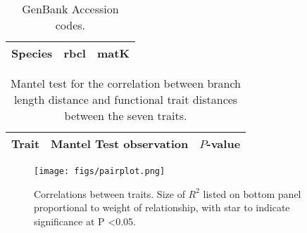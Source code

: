 \documentclass[12pt]{article}\usepackage[]{graphicx}\usepackage[]{color}
\begin{document}
\begin{table}[ht] \centering
	\caption{GenBank Accession codes.}
	\label{Tab:genbank}
	\begin{tabular}{l l l}
	\toprule
		Species & rbcl & matK \\
		\midrule
		
		\bottomrule
	\end{tabular}
\end{table}


\begin{table}[ht]
  \centering
	\caption{Mantel test for the correlation between branch length distance and functional trait distances between the seven traits.}
	\label{Tab:mantel}
	\begin{tabular}{l r r}
	\toprule
		Trait & Mantel Test observation & $P$-value \\
		\midrule
		
		\bottomrule
	\end{tabular}
\end{table}

\begin{figure}[!ht]
	\scalebox{0.3}
	{\texttt{[image: figs/pairplot.png]}}
	\caption{Correlations between traits. Size of $R^2$ listed on bottom panel proportional to weight of relationship, with star to indicate significance at P \textless 0.05.}
	\label{Fig:pairplot}
\end{figure}
\end{document}
